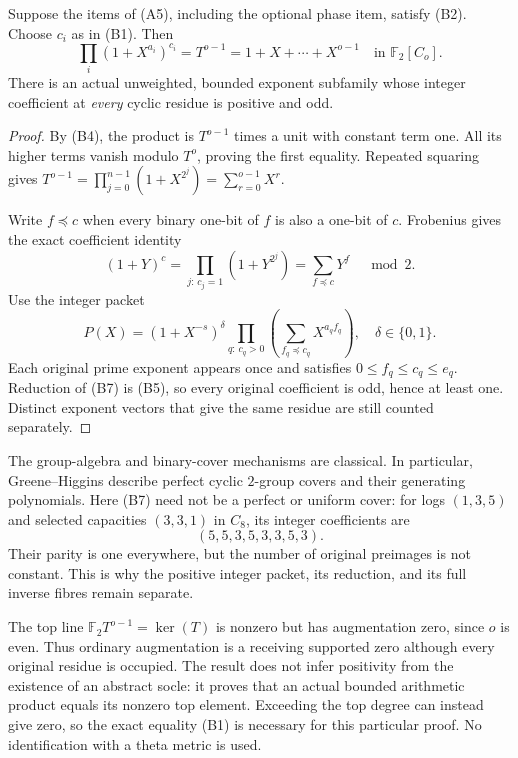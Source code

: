\begin{theorem}\label{thm:top}
Suppose the items of (A5), including the optional phase item, satisfy (B2).
Choose $c_i$ as in (B1). Then
\[
 \boxed{\prod_i(1+X^{a_i})^{c_i}
 =T^{o-1}=1+X+\cdots+X^{o-1}\quad\text{in }\mathbb F_2[C_o].} \tag{B5}
\]
There is an actual unweighted, bounded exponent subfamily whose integer
coefficient at \emph{every} cyclic residue is positive and odd.
\end{theorem}
\begin{proof}
By (B4), the product is $T^{o-1}$ times a unit with constant term one.
All its higher terms vanish modulo $T^o$, proving the first equality.
Repeated squaring gives
$T^{o-1}=\prod_{j=0}^{n-1}(1+X^{2^j})=\sum_{r=0}^{o-1}X^r$.

Write $f\preceq c$ when every binary one-bit of $f$ is also a one-bit of
$c$. Frobenius gives the exact coefficient identity
\[
 (1+Y)^c=\prod_{j:\,c_j=1}(1+Y^{2^j})
 =\sum_{f\preceq c}Y^f\quad\bmod2.                       \tag{B6}
\]
Use the integer packet
\[
 P(X)=(1+X^{-s})^\delta
       \prod_{q:\,c_q>0}\left(\sum_{f_q\preceq c_q}X^{a_qf_q}\right),
 \quad\delta\in\{0,1\}.                                 \tag{B7}
\]
Each original prime exponent appears once and satisfies
$0\le f_q\le c_q\le e_q$. Reduction of (B7) is (B5), so every original
coefficient is odd, hence at least one. Distinct exponent vectors that give
the same residue are still counted separately.
\end{proof}

The group-algebra and binary-cover mechanisms are classical. In particular,
Greene--Higgins \cite[\S1; Theorem 12, p.~7]{GH} describe perfect cyclic
$2$-group covers and their generating polynomials. Here (B7) need not be a
perfect or uniform cover: for logs $(1,3,5)$ and selected capacities
$(3,3,1)$ in $C_8$, its integer coefficients are
\[
 (5,5,3,5,3,3,5,3).
\]
Their parity is one everywhere, but the number of original preimages is not
constant. This is why the positive integer packet, its reduction, and its
full inverse fibres remain separate.

The top line $\mathbb F_2T^{o-1}=\ker(T)$ is nonzero but has augmentation
zero, since $o$ is even. Thus ordinary augmentation is a receiving supported
zero although every original residue is occupied. The result does not infer
positivity from the existence of an abstract socle: it proves that an actual
bounded arithmetic product equals its nonzero top element. Exceeding the top
degree can instead give zero, so the exact equality (B1) is necessary for this
particular proof. No identification with a theta metric is used.

